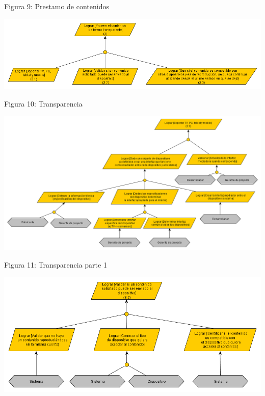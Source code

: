 \documentclass[11pt, a4paper, spanish]{article}
\begin{document}
	\begin{center}
		\small{Figura 9: Prestamo de contenidos}
	\end{center}
\newpage
	\begin{center}
		\includegraphics[scale=0.65, angle=90]{Diagramas/3ModelodeObjetivosTransparente.png}
	\end{center}
	\begin{center}
		\small{Figura 10: Transparencia}
	\end{center}
\newpage
	\begin{center}
		\includegraphics[scale=0.57, angle=90]{Diagramas/3-1ModelodeObjetivosTransparencia.png}
	\end{center}
	\begin{center}
		\small{Figura 11: Transparencia parte 1}
	\end{center}
\newpage
	\begin{center}
		\includegraphics[scale=0.65, angle=90]{Diagramas/3-2ModelodeObjetivosTransparencia.png}
	\end{center}
\end{document}

